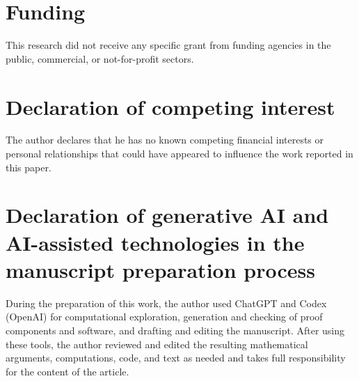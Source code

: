 \documentclass[preprint,12pt]{elsarticle}
\theoremstyle{definition}
\begin{document}
\section*{Funding}

This research did not receive any specific grant from funding agencies in the
public, commercial, or not-for-profit sectors.

\section*{Declaration of competing interest}

The author declares that he has no known competing financial interests or
personal relationships that could have appeared to influence the work
reported in this paper.

\section*{Declaration of generative AI and AI-assisted technologies in the
manuscript preparation process}

During the preparation of this work, the author used ChatGPT and Codex
(OpenAI) for computational exploration, generation and checking of proof
components and software, and drafting and editing the manuscript.  After
using these tools, the author reviewed and edited the resulting mathematical
arguments, computations, code, and text as needed and takes full
responsibility for the content of the article.
\end{document}
